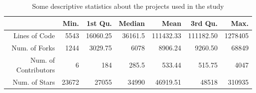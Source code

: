 \begin{table}[ht]
 \centering
 \begin{tabular}{rrrrrrr}
   \hline
             & Min. & 1st Qu. & Median & Mean & 3rd Qu. & Max. \\ \hline
 Lines of Code           & \num{5543}  & \num{16060.25} & \num{36161.5} & \num{111432.33} & \num{111182.50} & \num{1278405} \\
 Num. of Forks     & \num{1244}   & \num{3029.75} & \num{6078} & \num{8906.24} & \num{9260.50} & \num{68849} \\
 Num. of Contributors  & \num{6}   & \num{184} & \num{285.5} & \num{533.44} & \num{515.75} & \num{4047} \\
 Num. of Stars        & \num{23672} & \num{27055} & \num{34990} & \num{46919.51} & \num{48518} & \num{310935} \\
 
    \hline
 \end{tabular}
 \caption{Some descriptive statistics about the projects used in the study}
 \label{tab:projects-statistics} 
 \end{table}


